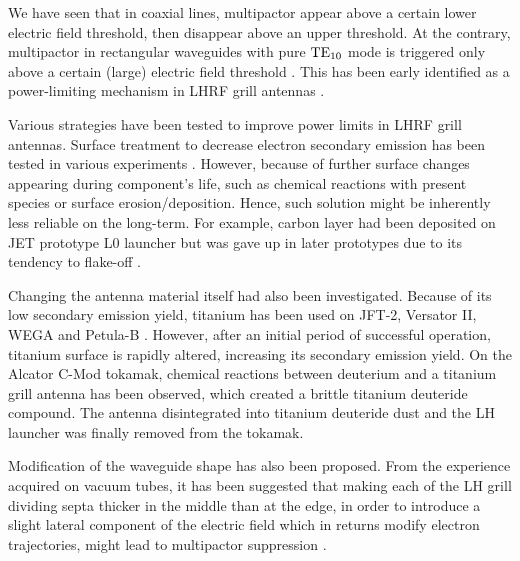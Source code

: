 


We have seen that in coaxial lines, multipactor appear above a certain lower electric field threshold, then disappear above an upper threshold. At the contrary, multipactor in rectangular waveguides with pure ${\mathrm{TE}}_{10}$ mode is triggered only above a certain (large) electric field threshold . This has been early identified as a power-limiting mechanism in LHRF grill antennas . 


Various strategies have been tested to improve power limits in LHRF grill antennas. Surface treatment to decrease electron secondary emission has been tested in various experiments . However, because of further surface changes appearing during component's life, such as chemical reactions with present species or surface erosion/deposition. Hence, such solution might be inherently less reliable on the long-term. For example, carbon layer had been deposited on JET prototype L0 launcher but was gave up in later prototypes due to its tendency to flake-off .

Changing the antenna material itself had also been investigated. Because of its low secondary emission yield, titanium has been used on JFT-2, Versator II, WEGA and Petula-B . However, after an initial period of successful operation, titanium surface is rapidly altered, increasing its secondary emission yield. On the Alcator C-Mod tokamak, chemical reactions between deuterium and a titanium grill antenna has been observed, which created a brittle titanium deuteride compound. The antenna disintegrated into titanium deuteride dust and the LH launcher was finally removed from the tokamak. 

Modification of the waveguide shape has also been proposed. From the experience acquired on vacuum tubes, it has been suggested that making each of the LH grill dividing septa thicker in the middle than at the edge, in order to introduce a slight lateral component of the electric field which in returns modify electron trajectories, might lead to multipactor suppression .

